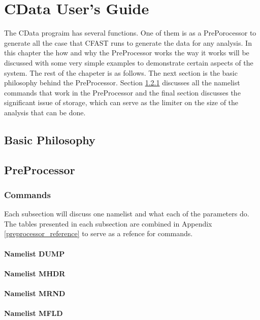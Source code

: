 \documentclass[12pt,twoside]{book}
\begin{document}
\chapter{CData User's Guide}
The CData prograim has several functions. One of them is as a PrePorocessor to generate all the case that CFAST runs to generate the data for any analysis. In this chapter the how and why the PreProcessor works the way it works will be discussed with some very simple examples to demonstrate certain aspects of the system. The rest of the chapeter is as follows. The next section is the basic philosophy behind the PreProcessor. Section \ref{commands_section} discusses all the namelist commands that work in the PreProcessor and the final section discusses the significant issue of storage, which can serve as the limiter on the size of the analysis that can be done.

\section{Basic Philosophy}

\section{PreProcessor}

\subsection{Commands}
\label{commands_section}
Each subsection will discuss one namelist and what each of the parameters do. The tables presented in each subsection are combined in Appendix \ref{preprocessor_reference}  to serve as a refence for commands.

\subsubsection{Namelist DUMP}

\subsubsection{Namelist MHDR}

\subsubsection{Namelist MRND}

\subsubsection{Namelist MFLD}
\end{document}
